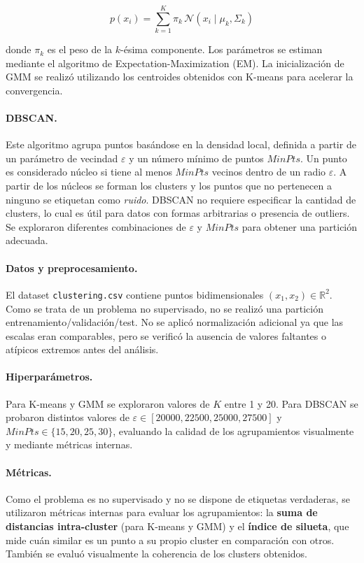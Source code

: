 \documentclass[11pt]{article}
\begin{document}
\[
p(x_i) = \sum_{k=1}^K \pi_k \, \mathcal{N}(x_i \mid \mu_k, \Sigma_k)
\]

donde $\pi_k$ es el peso de la $k$-ésima componente. Los parámetros se estiman mediante el algoritmo de Expectation-Maximization (EM). La inicialización de GMM se realizó utilizando los centroides obtenidos con K-means para acelerar la convergencia.

\paragraph{DBSCAN.} Este algoritmo agrupa puntos basándose en la densidad local, definida a partir de un parámetro de vecindad $\varepsilon$ y un número mínimo de puntos $MinPts$. Un punto es considerado núcleo si tiene al menos $MinPts$ vecinos dentro de un radio $\varepsilon$. A partir de los núcleos se forman los clusters y los puntos que no pertenecen a ninguno se etiquetan como \textit{ruido}. DBSCAN no requiere especificar la cantidad de clusters, lo cual es útil para datos con formas arbitrarias o presencia de outliers. Se exploraron diferentes combinaciones de $\varepsilon$ y $MinPts$ para obtener una partición adecuada.

\paragraph{Datos y preprocesamiento.} El dataset \texttt{clustering.csv} contiene puntos bidimensionales $(x_1, x_2) \in \mathbb{R}^2$. Como se trata de un problema no supervisado, no se realizó una partición entrenamiento/validación/test. No se aplicó normalización adicional ya que las escalas eran comparables, pero se verificó la ausencia de valores faltantes o atípicos extremos antes del análisis.

\paragraph{Hiperparámetros.} Para K-means y GMM se exploraron valores de $K$ entre 1 y 20. Para DBSCAN se probaron distintos valores de $\varepsilon \in [20000, 22500, 25000, 27500]$ y $MinPts \in \{15, 20, 25, 30\}$, evaluando la calidad de los agrupamientos visualmente y mediante métricas internas.

\paragraph{Métricas.} Como el problema es no supervisado y no se dispone de etiquetas verdaderas, se utilizaron métricas internas para evaluar los agrupamientos: la \textbf{suma de distancias intra-cluster} (para K-means y GMM) y el \textbf{índice de silueta}, que mide cuán similar es un punto a su propio cluster en comparación con otros. También se evaluó visualmente la coherencia de los clusters obtenidos.
\end{document}
